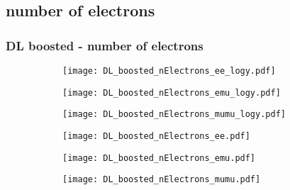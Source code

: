 \documentclass[aspectratio=169,8pt]{beamer}
\begin{document}
\subsection{number of electrons}
\begin{frame}
\frametitle{DL boosted - number of electrons}
\begin{figure}
\captionsetup[subfigure]{labelformat=empty}
\begin{subfigure}{0.32\textwidth}
\texttt{[image: DL\_boosted\_nElectrons\_ee\_logy.pdf]}
\vspace*{-0.15cm}
\end{subfigure}
\hfil
\begin{subfigure}{0.32\textwidth}
\texttt{[image: DL\_boosted\_nElectrons\_emu\_logy.pdf]}
\vspace*{-0.15cm}
\end{subfigure}
\hfil
\begin{subfigure}{0.32\textwidth}
\texttt{[image: DL\_boosted\_nElectrons\_mumu\_logy.pdf]}
\vspace*{-0.15cm}
\end{subfigure}
\hfil
\begin{subfigure}{0.32\textwidth}
\texttt{[image: DL\_boosted\_nElectrons\_ee.pdf]}
\vspace*{-0.15cm}
\end{subfigure}
\hfil
\begin{subfigure}{0.32\textwidth}
\texttt{[image: DL\_boosted\_nElectrons\_emu.pdf]}
\vspace*{-0.15cm}
\end{subfigure}
\hfil
\begin{subfigure}{0.32\textwidth}
\texttt{[image: DL\_boosted\_nElectrons\_mumu.pdf]}
\vspace*{-0.15cm}
\end{subfigure}
\hfil
\end{figure}
\end{frame}
\newpage
\end{document}
